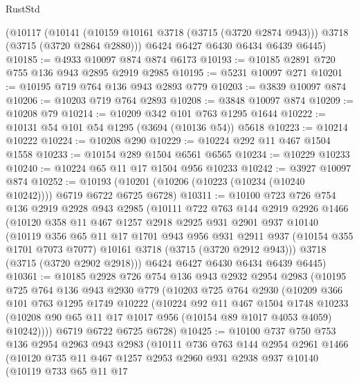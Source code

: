 \begin{lexlean}{RustStd}
\begin{coremodule}
    (@10117
      (@10141 (@10159 @10161 @3718 (@3715 (@3720 @2874 @943))) @3718 (@3715 (@3720 @2864 @2880)))
      @6424
      @6427
      @6430
      @6434
      @6439
      @6445)
@10185 := @4933 @10097 @874 @874 @6173
@10193 := @10185 @2891 @720 @755 @136 @943 @2895 @2919 @2985
@10195 := @5231 @10097 @271
@10201 := @10195 @719 @764 @136 @943 @2893 @779
@10203 := @3839 @10097 @874
@10206 := @10203 @719 @764 @2893
@10208 := @3848 @10097 @874
@10209 := @10208 @79
@10214 := @10209 @342 @101 @763 @1295 @1644
@10222 := @10131 @54 @101 @54 @1295 (@3694 (@10136 @54)) @5618
@10223 := @10214 @10222
@10224 := @10208 @290
@10229 := @10224 @292 @11 @467 @1504 @1558
@10233 := @10154 @289 @1504 @6561 @6565
@10234 := @10229 @10233
@10240 := @10224 @65 @11 @17 @1504 @956 @10233
@10242 := @3927 @10097 @874
@10252 := @10193 (@10201 (@10206 (@10223 (@10234 (@10240 @10242)))) @6719 @6722 @6725 @6728)
@10311 := @10100
    @723
    @726
    @754
    @136
    @2919
    @2928
    @943
    @2985
    (@10111
      @722
      @763
      @144
      @2919
      @2926
      @1466
      (@10120
        @358
        @11
        @467
        @1257
        @2918
        @2925
        @931
        @2901
        @937
        @10140
        (@10119
          @356
          @65
          @11
          @17
          @1701
          @943
          @956
          @931
          @2911
          @937
          (@10154 @355 @1701 @7073 @7077)
          @10161
          @3718
          (@3715 (@3720 @2912 @943)))
        @3718
        (@3715 (@3720 @2902 @2918)))
      @6424
      @6427
      @6430
      @6434
      @6439
      @6445)
@10361 := @10185
    @2928
    @726
    @754
    @136
    @943
    @2932
    @2954
    @2983
    (@10195
      @725
      @764
      @136
      @943
      @2930
      @779
      (@10203
        @725
        @764
        @2930
        (@10209
          @366
          @101
          @763
          @1295
          @1749
          @10222
          (@10224
            @92
            @11
            @467
            @1504
            @1748
            @10233
            (@10208 @90 @65 @11 @17 @1017 @956 (@10154 @89 @1017 @4053 @4059) @10242))))
      @6719
      @6722
      @6725
      @6728)
@10425 := @10100
    @737
    @750
    @753
    @136
    @2954
    @2963
    @943
    @2983
    (@10111
      @736
      @763
      @144
      @2954
      @2961
      @1466
      (@10120
        @735
        @11
        @467
        @1257
        @2953
        @2960
        @931
        @2938
        @937
        @10140
        (@10119
          @733
          @65
          @11
          @17

\end{coremodule}
\end{lexlean}
